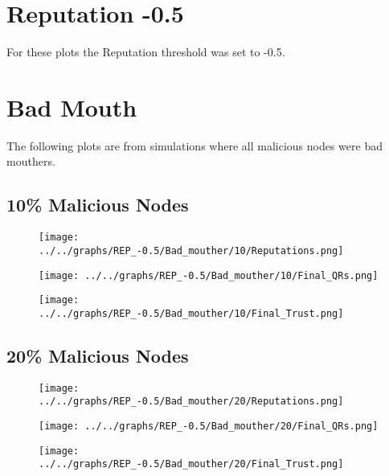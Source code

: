 \section*{Reputation -0.5}
For these plots the Reputation threshold was set to -0.5.
\section*{Bad Mouth}
The following plots are from simulations where all malicious nodes were
bad mouthers.
\\
\begin{minipage}[t]{0.49\columnwidth}
\subsection*{10\% Malicious Nodes}
    \begin{figure}[H]
        \centering
        \texttt{[image: ../../graphs/REP\_-0.5/Bad\_mouther/10/Reputations.png]}
    \end{figure}
    \begin{figure}[H]
        \centering
        \texttt{[image: ../../graphs/REP\_-0.5/Bad\_mouther/10/Final\_QRs.png]}
    \end{figure}
\end{minipage}
\begin{minipage}[t]{0.49\columnwidth}
    \begin{figure}[H]
        \centering
        \texttt{[image: ../../graphs/REP\_-0.5/Bad\_mouther/10/Final\_Trust.png]}
    \end{figure}
\end{minipage}

\begin{minipage}[t]{0.49\columnwidth}
\subsection*{20\% Malicious Nodes}
    \begin{figure}[H]
        \centering
        \texttt{[image: ../../graphs/REP\_-0.5/Bad\_mouther/20/Reputations.png]}
    \end{figure}
    \begin{figure}[H]
        \centering
        \texttt{[image: ../../graphs/REP\_-0.5/Bad\_mouther/20/Final\_QRs.png]}
    \end{figure}
\end{minipage}
\begin{minipage}[t]{0.49\columnwidth}
    \begin{figure}[H]
        \centering
        \texttt{[image: ../../graphs/REP\_-0.5/Bad\_mouther/20/Final\_Trust.png]}
    \end{figure}
\end{minipage}

